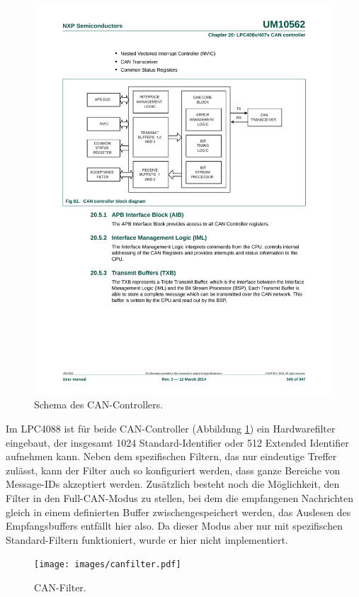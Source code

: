 \begin{figure}
	\centering
		\includegraphics[height=0.9\textheight]{images/cancontroller.pdf}
	\caption{Schema des CAN-Controllers.}
	\label{fig.cancontroller}
\end{figure}

Im LPC4088 ist für beide CAN-Controller (Abbildung \ref{fig.cancontroller}) ein Hardwarefilter eingebaut, der insgesamt 1024 Standard-Identifier oder 512 Extended Identifier aufnehmen kann. Neben dem spezifischen Filtern, das nur eindeutige Treffer zulässt, kann der Filter auch so konfiguriert werden, dass ganze Bereiche von Message-IDs akzeptiert werden. Zusätzlich besteht noch die Möglichkeit, den Filter in den Full-CAN-Modus zu stellen, bei dem die empfangenen Nachrichten gleich in einem definierten Buffer zwischengespeichert werden, das Auslesen des Empfangsbuffers entfällt hier also. Da dieser Modus aber nur mit spezifischen Standard-Filtern funktioniert, wurde er hier nicht implementiert.

\begin{figure}
	\centering
		\texttt{[image: images/canfilter.pdf]}
	\caption{CAN-Filter.}
	\label{fig.canfilter}
\end{figure}

